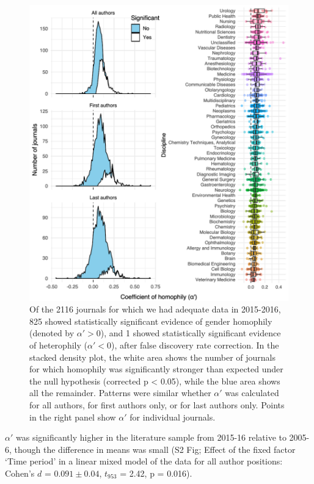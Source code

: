 \documentclass[12pt,]{article}
\begin{document}
\begin{figure}
\centering
\includegraphics{../figures/Fig2.pdf}
\caption{Of the 2116 journals for which we had adequate data in
2015-2016, 825 showed statistically significant evidence of gender
homophily (denoted by \(\alpha' > 0\)), and 1 showed statistically
significant evidence of heterophily (\(\alpha' < 0\)), after false
discovery rate correction. In the stacked density plot, the white area
shows the number of journals for which homophily was significantly
stronger than expected under the null hypothesis (corrected p
\textless{} 0.05), while the blue area shows all the remainder. Patterns
were similar whether \(\alpha'\) was calculated for all authors, for
first authors only, or for last authors only. Points in the right panel
show \(\alpha'\) for individual journals.\label{alpha_histograms}}
\end{figure}

\(\alpha'\) was significantly higher in the literature sample from
2015-16 relative to 2005-6, though the difference in means was small (S2
Fig; Effect of the fixed factor `Time period' in a linear mixed model of
the data for all author positions: Cohen's \(d\) = \(0.091{\pm}0.04\),
\(t_{953}\) = 2.42, p = 0.016).
\end{document}
